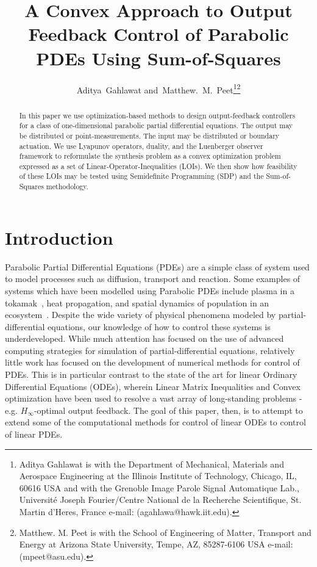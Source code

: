 \documentclass[9pt,journal,twocolumn]{IEEEtran}
\begin{document}
\title{A Convex Approach to Output Feedback Control of Parabolic PDEs Using Sum-of-Squares}


\author{Aditya~Gahlawat
         and~Matthew.~M.~Peet\thanks{Aditya Gahlawat is with the Department
of Mechanical, Materials and Aerospace Engineering at the Illinois Institute of Technology, Chicago,
IL, 60616 USA and with the Grenoble Image Parole Signal Automatique Lab., Universit\'{e} Joseph Fourier/Centre National de la Recherche Scientifique, St. Martin d'Heres, France e-mail: (agahlawa@hawk.iit.edu).}\thanks{Matthew. M. Peet is with the School of Engineering of Matter, Transport and Energy at Arizona State University, Tempe, AZ, 85287-6106 USA e-mail: (mpeet@asu.edu).}}










\maketitle

\begin{abstract}
In this paper we use optimization-based methods to design output-feedback controllers for a class of one-dimensional parabolic partial differential equations. The output may be distributed or point-measurements. The input may be distributed or boundary actuation. We use Lyapunov operators, duality, and the Luenberger observer framework to reformulate the synthesis problem as a convex optimization problem expressed as a set of Linear-Operator-Inequalities (LOIs). We then show how feasibility of these LOIs may be tested using Semidefinite Programming (SDP) and the Sum-of-Squares methodology.
\end{abstract}
\IEEEpeerreviewmaketitle

\section{Introduction}

Parabolic Partial Differential Equations (PDEs) are a simple class of system used to model processes such as diffusion, transport and reaction.  Some examples of systems which have been modelled using Parabolic PDEs include plasma in a tokamak~\cite{witrant2007control}, heat propagation, and spatial dynamics of population in an ecosystem~\cite{murray2002mathematical}. Despite the wide variety of physical phenomena modeled by partial-differential equations, our knowledge of how to control these systems is underdeveloped. While much attention has focused on the use of advanced computing strategies for simulation of partial-differential equations, relatively little work has focused on the development of numerical methods for control of PDEs. This is in particular contrast to the state of the art for linear Ordinary Differential Equations (ODEs), wherein Linear Matrix Inequalities and Convex optimization have been used to resolve a vast array of long-standing problems - e.g. $H_\infty$-optimal output feedback. The goal of this paper, then, is to attempt to extend some of the computational methods for control of linear ODEs to control of linear PDEs.
\end{document}
